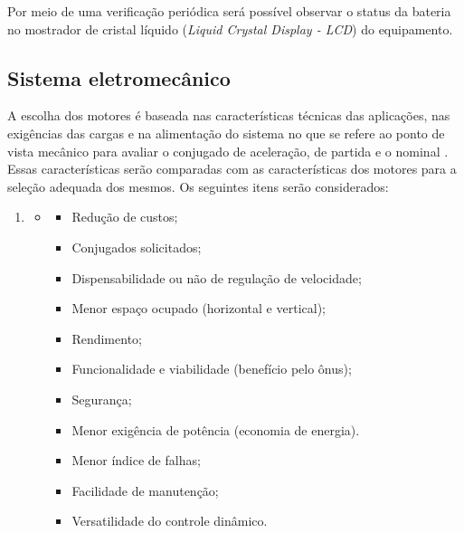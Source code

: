 
Por meio de uma verificação periódica será possível observar o status da bateria no mostrador de cristal líquido (\textit{Liquid Crystal Display - LCD}) do equipamento. 

\subsection{Sistema eletromecânico}

A escolha dos motores é baseada nas características técnicas das aplicações, nas exigências das cargas e na alimentação do sistema no que se refere ao ponto de vista mecânico para avaliar o conjugado de aceleração, de partida e o nominal \cite{santos_2016}. Essas características serão comparadas com as características dos motores para a seleção adequada dos mesmos. Os seguintes itens serão considerados:

\begin{enumerate}
    \item[ ]
    \begin{itemize}
        \item[ ]
        \begin{itemize}
            \item Redução de custos;
            \item Conjugados solicitados;
            \item Dispensabilidade ou não de regulação de velocidade;
            \item Menor espaço ocupado (horizontal e vertical);
            \item Rendimento;
            \item Funcionalidade e viabilidade (benefício pelo ônus);
            \item Segurança;
            \item Menor exigência de potência (economia de energia).
            \item Menor índice de falhas;
            \item Facilidade de manutenção;
            \item Versatilidade do controle dinâmico.
        \end{itemize}
    \end{itemize}
\end{enumerate}


